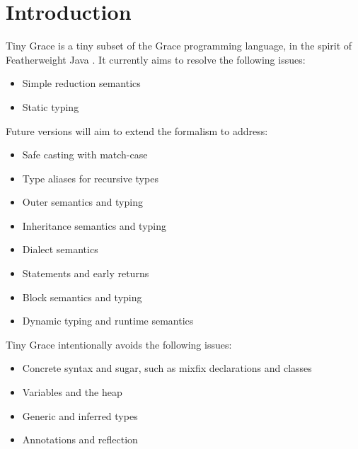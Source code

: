 \section{Introduction}

Tiny Grace is a tiny subset of the Grace programming language, in the spirit of
Featherweight Java \cite{fj}.  It currently aims to resolve the following
issues:

\begin{itemize}

\item Simple reduction semantics

\item Static typing

\end{itemize}

\noindent Future versions will aim to extend the formalism to address:

\begin{itemize}

\item Safe casting with match-case

\item Type aliases for recursive types

\item Outer semantics and typing

\item Inheritance semantics and typing

\item Dialect semantics

\item Statements and early returns

\item Block semantics and typing

\item Dynamic typing and runtime semantics

\end{itemize}

\noindent Tiny Grace intentionally avoids the following issues:

\begin{itemize}

\item Concrete syntax and sugar, such as mixfix declarations and classes

\item Variables and the heap

\item Generic and inferred types

\item Annotations and reflection

\end{itemize}

